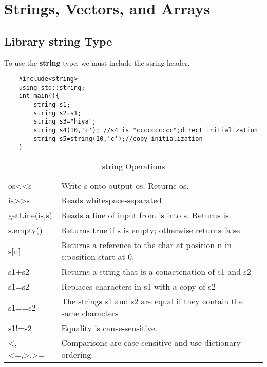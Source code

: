 \documentclass[UTF8]{ctexart}
\begin{document}
\section{Strings, Vectors, and Arrays}

\subsection{Library string Type}
To use the \textbf{string} type, we must include the string header.
\begin{lstlisting}
	#include<string>
	using std::string;
	int main(){
		string s1;
		string s2=s1;
		string s3="hiya";
		string s4(10,'c'); //s4 is "cccccccccc";direct initialization
		string s5=string(10,'c');//copy initialization
	}
\end{lstlisting}

\begin{table}[H]
	\centering
	\begin{tabular}{|l|l|}
		\hline
		os<<s           & Write s onto output os. Returns os.                                       \\
		is>>s           & Reads whitespace-separated                                                \\
		getLine(is,s)   & Reads a line of input from is into s. Returns is.                         \\
		s.empty()       & Returns true if s is empty; otherwise returns false                       \\
		s[n]            & Returns a reference to the char at position n in s;position start at 0.   \\
		s1+s2           & Returns a string that is a conactenation of s1 and s2                     \\
		s1=s2           & Replaces characters in s1 with a copy of s2                               \\
		s1==s2          & The strings s1 and s2 are equal if they contain the same characters       \\
		s1!=s2          & Equality is canse-sensitive.                                              \\
		<,<=,>,>=       & Comparisons are case-sensitive and use dictionary ordering.               \\
		\hline
	\end{tabular}
	\caption*{string Operations}
\end{table}%
\end{document}
